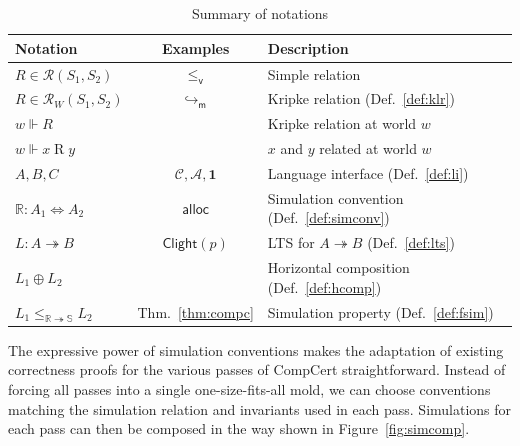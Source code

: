 \documentclass[11pt,oneside]{book}
\theoremstyle{definition}
\newcommand{\kw}[1]{\ensuremath{ \mathsf{#1} }}
\newcommand{\que}{\circ}         %
\newcommand{\ans}{\bullet}       %
\newcommand{\vref}{\le_\kw{v}}   %
\newcommand{\figsize}{}
\begin{document}
\begin{table} %
  \centering
  \figsize
  \begin{tabular}{lcl}
    \hline
    Notation & Examples & Description \\
    \hline
    $R \in \mathcal{R}(S_1, S_2)$ &
      $\vref$ &
      Simple relation \\
    $R \in \mathcal{R}_W(S_1, S_2)$ &
      $\hookrightarrow_\kw{m}$ &
      Kripke relation (Def.~\ref{def:klr}) \\
    $w \Vdash R$ & &
      Kripke relation at world $w$ \\
    $w \Vdash x \mathrel{R} y$ & &
      $x$ and $y$ related at world $w$ \\
    \hline
    $A, B, C$ &
      $\mathcal{C}, \mathcal{A}, \mathbf{1}$ &
      Language interface (Def.~\ref{def:li}) \\
    $\mathbb{R} : A_1 \Leftrightarrow A_2$ &
      $\kw{alloc}$ &
      Simulation convention (Def.~\ref{def:simconv}) \\
    $L : A \twoheadrightarrow B$ &
      $\kw{Clight}(p)$ &
      LTS for $A \twoheadrightarrow B$ (Def.~\ref{def:lts}) \\
    $L_1 \oplus L_2$ & &
      Horizontal composition (Def.~\ref{def:hcomp}) \\
    $L_1 \le_{\mathbb{R} \twoheadrightarrow \mathbb{S}} L_2$ &
      Thm.~\ref{thm:compc} &
      Simulation property (Def.~\ref{def:fsim}) \\
    \hline
  \end{tabular}
  \caption[Summary of the notations used in Chapter~\ref{sec:compcerto}]%
    {Summary of notations}
  \label{tbl:notations}
\end{table}

The expressive power of simulation conventions
makes the adaptation of existing correctness proofs
for the various passes of CompCert straightforward.
Instead of forcing all passes into a single one-size-fits-all mold,
we can choose conventions matching
the simulation relation and invariants
used in each pass.
Simulations for each pass can then be composed
in the way shown in Figure~\ref{fig:simcomp}.
\end{document}
